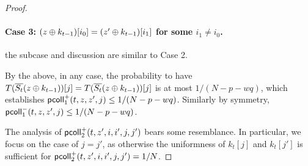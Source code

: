 \begin{proof}
	
	
	
	\paragraph{Case 3: $(z\oplus k_{t-1})[i_0]=(z'\oplus k_{t-1})[i_1]$ for some $i_1\neq i_0$.}
	
	the subcase and discussion are similar to Case 2.
	
	
	
	\arrangespace
	
	
	By the above, in any case, the probability to have $T(\overline{S_t}(z\oplus k_{t-1}))[j]=T(\overline{S_t}(z\oplus k_{t-1}))[j]$ is at most $1/(N-p-wq)$, which establishes $\mathsf{pcoll}_{1}^+(t,z,z',j)\leq1/(N-p-wq)$. Similarly by symmetry, $\mathsf{pcoll}_{1}^-(t,z,z',j)\leq1/(N-p-wq)$.
	
	
	
	
	\arrangespace
	
	
	The analysis of $\mathsf{pcoll}_{2}^+(t,z',i,i',j,j')$ bears some resemblance. In particular, we focus on the case of $j=j'$, as otherwise the uniformness of $k_t[j]$ and $k_t[j']$ is sufficient for $\mathsf{pcoll}_{2}^+(t,z',i,i',j,j')=1/N$.
	

\end{proof}
